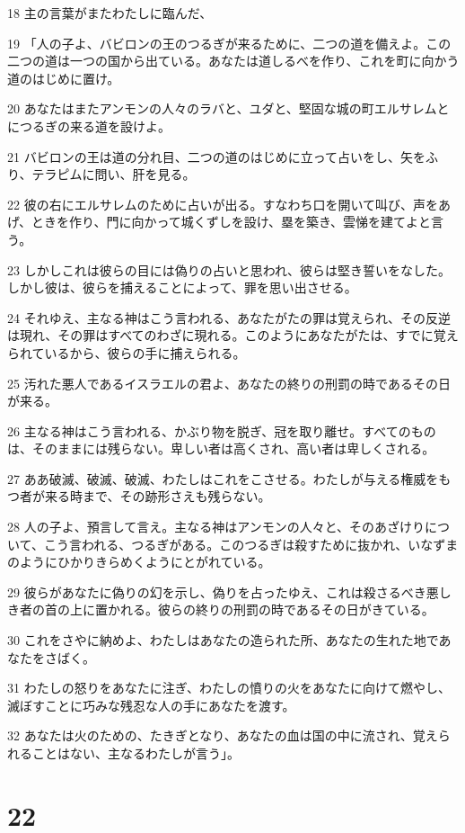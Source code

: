 \par 18 主の言葉がまたわたしに臨んだ、
\par 19 「人の子よ、バビロンの王のつるぎが来るために、二つの道を備えよ。この二つの道は一つの国から出ている。あなたは道しるべを作り、これを町に向かう道のはじめに置け。
\par 20 あなたはまたアンモンの人々のラバと、ユダと、堅固な城の町エルサレムとにつるぎの来る道を設けよ。
\par 21 バビロンの王は道の分れ目、二つの道のはじめに立って占いをし、矢をふり、テラピムに問い、肝を見る。
\par 22 彼の右にエルサレムのために占いが出る。すなわち口を開いて叫び、声をあげ、ときを作り、門に向かって城くずしを設け、塁を築き、雲悌を建てよと言う。
\par 23 しかしこれは彼らの目には偽りの占いと思われ、彼らは堅き誓いをなした。しかし彼は、彼らを捕えることによって、罪を思い出させる。
\par 24 それゆえ、主なる神はこう言われる、あなたがたの罪は覚えられ、その反逆は現れ、その罪はすべてのわざに現れる。このようにあなたがたは、すでに覚えられているから、彼らの手に捕えられる。
\par 25 汚れた悪人であるイスラエルの君よ、あなたの終りの刑罰の時であるその日が来る。
\par 26 主なる神はこう言われる、かぶり物を脱ぎ、冠を取り離せ。すべてのものは、そのままには残らない。卑しい者は高くされ、高い者は卑しくされる。
\par 27 ああ破滅、破滅、破滅、わたしはこれをこさせる。わたしが与える権威をもつ者が来る時まで、その跡形さえも残らない。
\par 28 人の子よ、預言して言え。主なる神はアンモンの人々と、そのあざけりについて、こう言われる、つるぎがある。このつるぎは殺すために抜かれ、いなずまのようにひかりきらめくようにとがれている。
\par 29 彼らがあなたに偽りの幻を示し、偽りを占ったゆえ、これは殺さるべき悪しき者の首の上に置かれる。彼らの終りの刑罰の時であるその日がきている。
\par 30 これをさやに納めよ、わたしはあなたの造られた所、あなたの生れた地であなたをさばく。
\par 31 わたしの怒りをあなたに注ぎ、わたしの憤りの火をあなたに向けて燃やし、滅ぼすことに巧みな残忍な人の手にあなたを渡す。
\par 32 あなたは火のための、たきぎとなり、あなたの血は国の中に流され、覚えられることはない、主なるわたしが言う」。

\chapter{22}

